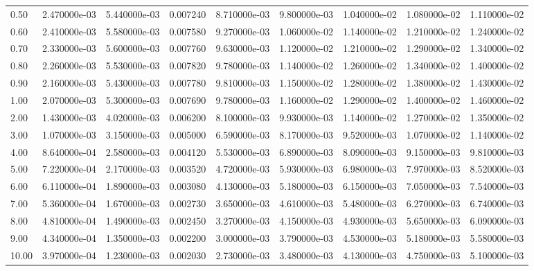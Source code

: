 \begin{tabular}{lrrrrrrrr}
0.50  &  2.470000e-03 &  5.440000e-03 &  0.007240 &  8.710000e-03 &  9.800000e-03 &  1.040000e-02 &  1.080000e-02 &  1.110000e-02 \\
0.60  &  2.410000e-03 &  5.580000e-03 &  0.007580 &  9.270000e-03 &  1.060000e-02 &  1.140000e-02 &  1.210000e-02 &  1.240000e-02 \\
0.70  &  2.330000e-03 &  5.600000e-03 &  0.007760 &  9.630000e-03 &  1.120000e-02 &  1.210000e-02 &  1.290000e-02 &  1.340000e-02 \\
0.80  &  2.260000e-03 &  5.530000e-03 &  0.007820 &  9.780000e-03 &  1.140000e-02 &  1.260000e-02 &  1.340000e-02 &  1.400000e-02 \\
0.90  &  2.160000e-03 &  5.430000e-03 &  0.007780 &  9.810000e-03 &  1.150000e-02 &  1.280000e-02 &  1.380000e-02 &  1.430000e-02 \\
1.00  &  2.070000e-03 &  5.300000e-03 &  0.007690 &  9.780000e-03 &  1.160000e-02 &  1.290000e-02 &  1.400000e-02 &  1.460000e-02 \\
2.00  &  1.430000e-03 &  4.020000e-03 &  0.006200 &  8.100000e-03 &  9.930000e-03 &  1.140000e-02 &  1.270000e-02 &  1.350000e-02 \\
3.00  &  1.070000e-03 &  3.150000e-03 &  0.005000 &  6.590000e-03 &  8.170000e-03 &  9.520000e-03 &  1.070000e-02 &  1.140000e-02 \\
4.00  &  8.640000e-04 &  2.580000e-03 &  0.004120 &  5.530000e-03 &  6.890000e-03 &  8.090000e-03 &  9.150000e-03 &  9.810000e-03 \\
5.00  &  7.220000e-04 &  2.170000e-03 &  0.003520 &  4.720000e-03 &  5.930000e-03 &  6.980000e-03 &  7.970000e-03 &  8.520000e-03 \\
6.00  &  6.110000e-04 &  1.890000e-03 &  0.003080 &  4.130000e-03 &  5.180000e-03 &  6.150000e-03 &  7.050000e-03 &  7.540000e-03 \\
7.00  &  5.360000e-04 &  1.670000e-03 &  0.002730 &  3.650000e-03 &  4.610000e-03 &  5.480000e-03 &  6.270000e-03 &  6.740000e-03 \\
8.00  &  4.810000e-04 &  1.490000e-03 &  0.002450 &  3.270000e-03 &  4.150000e-03 &  4.930000e-03 &  5.650000e-03 &  6.090000e-03 \\
9.00  &  4.340000e-04 &  1.350000e-03 &  0.002200 &  3.000000e-03 &  3.790000e-03 &  4.530000e-03 &  5.180000e-03 &  5.580000e-03 \\
10.00 &  3.970000e-04 &  1.230000e-03 &  0.002030 &  2.730000e-03 &  3.480000e-03 &  4.130000e-03 &  4.750000e-03 &  5.100000e-03 \\
\bottomrule
\end{tabular}
